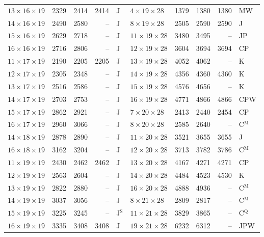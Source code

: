 \begin{longtable}{@{}lrrrl@{\hspace{6mm}}lrrrl@{}}
$13{\times}16{\times}19$ & 2329 & 2414 & 2414 & J & $4{\times}19{\times}28$ & 1379 & 1380 & 1380 & MW\\
$14{\times}16{\times}19$ & 2490 & 2580 & -- & J & $8{\times}19{\times}28$ & 2505 & 2590 & 2590 & J\\
$15{\times}16{\times}19$ & 2629 & 2718 & -- & J & $11{\times}19{\times}28$ & 3480 & 3495 & -- & JP\\
$16{\times}16{\times}19$ & 2716 & 2806 & -- & J & $12{\times}19{\times}28$ & 3604 & 3694 & 3694 & CP\\
$11{\times}17{\times}19$ & 2190 & 2205 & 2205 & J & $13{\times}19{\times}28$ & 4052 & 4062 & -- & K\\
$12{\times}17{\times}19$ & 2305 & 2348 & -- & J & $14{\times}19{\times}28$ & 4356 & 4360 & 4360 & K\\
$13{\times}17{\times}19$ & 2516 & 2586 & -- & J & $15{\times}19{\times}28$ & 4576 & 4656 & -- & K\\
$14{\times}17{\times}19$ & 2703 & 2753 & -- & J & $16{\times}19{\times}28$ & 4771 & 4866 & 4866 & CPW\\
$15{\times}17{\times}19$ & 2862 & 2921 & -- & J & $7{\times}20{\times}28$ & 2413 & 2440 & 2454 & CP\\
$16{\times}17{\times}19$ & 2960 & 3066 & -- & J & $8{\times}20{\times}28$ & 2585 & 2640 & -- & C$^{\mathrm{M}}$\\
$14{\times}18{\times}19$ & 2878 & 2890 & -- & J & $11{\times}20{\times}28$ & 3521 & 3655 & 3655 & J\\
$16{\times}18{\times}19$ & 3162 & 3204 & -- & J & $12{\times}20{\times}28$ & 3713 & 3782 & 3786 & C$^{\mathrm{M}}$\\
$11{\times}19{\times}19$ & 2430 & 2462 & 2462 & J & $13{\times}20{\times}28$ & 4167 & 4271 & 4271 & CP\\
$12{\times}19{\times}19$ & 2563 & 2604 & -- & J & $14{\times}20{\times}28$ & 4484 & 4523 & 4530 & K\\
$13{\times}19{\times}19$ & 2822 & 2880 & -- & J & $16{\times}20{\times}28$ & 4888 & 4936 & -- & C$^{\mathrm{M}}$\\
$14{\times}19{\times}19$ & 3037 & 3056 & -- & J & $8{\times}21{\times}28$ & 2809 & 2817 & -- & C$^{\mathrm{M}}$\\
$15{\times}19{\times}19$ & 3225 & 3245 & -- & J$^{\mathrm{S}}$ & $11{\times}21{\times}28$ & 3829 & 3865 & -- & C$^{\mathrm{Q}}$\\
$16{\times}19{\times}19$ & 3335 & 3408 & 3408 & J & $19{\times}21{\times}28$ & 6232 & 6312 & -- & JPW\\

\end{longtable}
